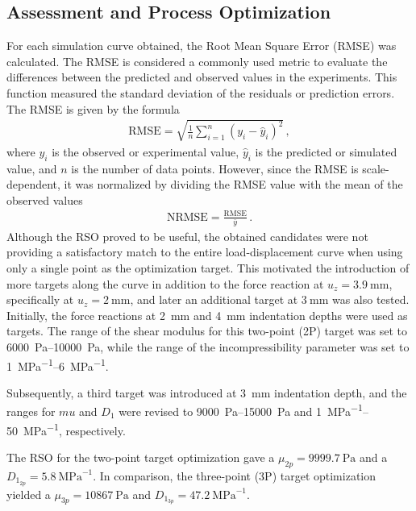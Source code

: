 \subsection*{Assessment and Process Optimization}
For each simulation curve obtained, the Root Mean Square Error (RMSE) was calculated.
The RMSE is considered a commonly used metric to evaluate the differences between the predicted and 
observed values in the experiments. This function measured the standard deviation of the residuals 
or prediction errors. The RMSE is given by the formula 
\begin{align}
	\text{RMSE} = \sqrt{\frac{1}{n}\sum_{i=1}^{n}(y_i - \hat{y}_i)^2}\, ,
    \label{eq:rmse}
\end{align}
where $y_i$ is the observed or experimental value, $\hat{y}_i$ is the predicted or simulated value, and 
$n$ is the number of data points. However, since the RMSE is scale-dependent, it was normalized by dividing the
RMSE value with the mean of the observed values%
\begin{align}
	\text{NRMSE} = \frac{\text{RMSE}}{\bar{y}} \, .
    \label{eq:nrmse}
\end{align}
Although the RSO proved to be useful, the obtained candidates were not providing a satisfactory 
match to the entire load-displacement curve when using only a single point as the optimization target.
This motivated the introduction of more targets along the curve in addition to the force reaction at 
$u_z=\SI{3.9}{\milli\meter}$, specifically at $u_z=\SI{2}{\milli\meter}$, 
and later an additional target at $\SI{3}{\milli\meter}$ was also tested.\\

Initially, the force reactions at \SI{2}{\milli\meter} and \SI{4}{\milli\meter} indentation depths
were used as targets. The range of the shear modulus for this two-point (2P) target was set to
\SIrange{6000}{10000}{\pascal}, while the range of the incompressibility parameter was set to 
\SIrange{1}{6}{\mega\pascal\tothe{-1}}.

Subsequently, a third target was introduced at \SI{3}{\milli\meter} indentation depth, and the ranges 
for $mu$ and $D_1$ were revised to \SIrange{9000}{15000}{\pascal} and \SIrange{1}{50}{\mega\pascal\tothe{-1}}, 
respectively.

The RSO for the two-point target optimization gave a $\mu_{2p}=\SI{9999.7}{\pascal}$ and a 
$D_{1_{2p}}=\SI{5.8}{\mega\pascal\tothe{-1}}$. In comparison, the three-point (3P) target optimization 
yielded a  $\mu_{3p}=\SI{10867}{\pascal}$ and $D_{1_{3p}}=\SI{47.2}{\mega\pascal\tothe{-1}}$.

